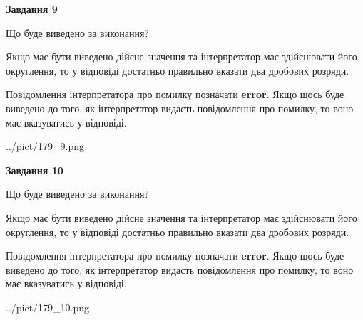 \documentclass[12pt, ukrainian]{article}
\begin{document}
{\begin {Large}
{\begin {center}\textbf{Завдання 9}\end {center}}\par
Що буде виведено за виконання? \par

Якщо має бути виведено дійсне значення та інтерпретатор має здійснювати його округлення, 
то у відповіді достатньо правильно вказати два дробових розряди.

Повідомлення інтерпретатора про помилку позначати \textbf{error}.
Якщо щось буде виведено до того, як інтерпретатор видасть повідомлення про помилку, 
то воно має вказуватись у відповіді. \par

\begin{center}
	{../pict/179_9.png}
\end{center}
\newpage

{\begin {center}\textbf{Завдання 10}\end {center}}\par
Що буде виведено за виконання? \par

Якщо має бути виведено дійсне значення та інтерпретатор має здійснювати його округлення, 
то у відповіді достатньо правильно вказати два дробових розряди.

Повідомлення інтерпретатора про помилку позначати \textbf{error}.
Якщо щось буде виведено до того, як інтерпретатор видасть повідомлення про помилку, 
то воно має вказуватись у відповіді. \par

\begin{center}
	{../pict/179_10.png}
\end{center}
\newpage

\end {Large}}
\end{document}
